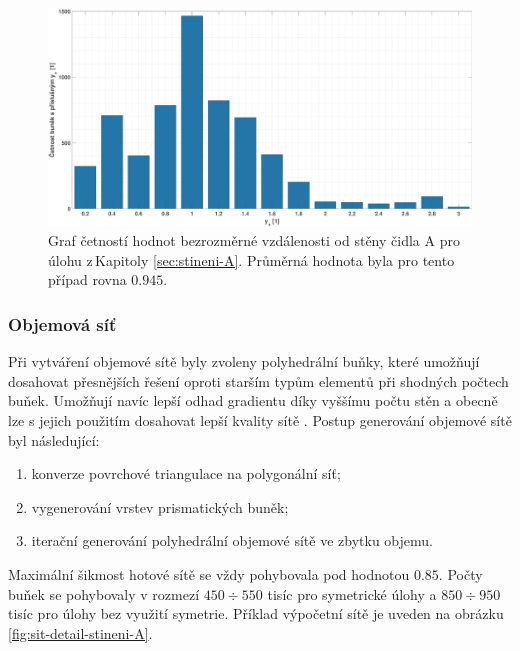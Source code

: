             \begin{figure}[ht!]
                \centering
                \includegraphics*[width=\textwidth  ]{300_VYPOCETNI_MODEL/yplus-stineni-A.eps}
                \caption{Graf četností hodnot bezrozměrné vzdálenosti od stěny čidla A pro úlohu z\,Kapitoly \ref{sec:stineni-A}. Průměrná hodnota byla pro tento případ rovna $0.945$.}
                \label{fig:yplus-stineni-A}
            \end{figure}

            \newpage


        \subsubsection{Objemová síť}

        Při vytváření objemové sítě byly zvoleny polyhedrální buňky, které umožňují dosahovat přesnějších řešení oproti starším typům elementů při shodných počtech buňek. Umožňují navíc lepší odhad gradientu díky vyššímu počtu stěn a obecně lze s jejich použitím dosahovat lepší kvality sítě \cite{Sosnowski2018}. Postup generování objemové sítě byl následující:

        \begin{enumerate}
            \item konverze povrchové triangulace na polygonální síť;
            \item vygenerování vrstev prismatických buněk;
            \item iterační generování polyhedrální objemové sítě ve zbytku objemu.
        \end{enumerate}

        Maximální šikmost hotové sítě se vždy pohybovala pod hodnotou $0.85$. Počty buňek se pohybovaly v rozmezí $450 \div 550$ tisíc pro symetrické úlohy a $850 \div 950$ tisíc pro úlohy bez využití symetrie. Příklad výpočetní sítě je uveden na obrázku \ref{fig:sit-detail-stineni-A}.

